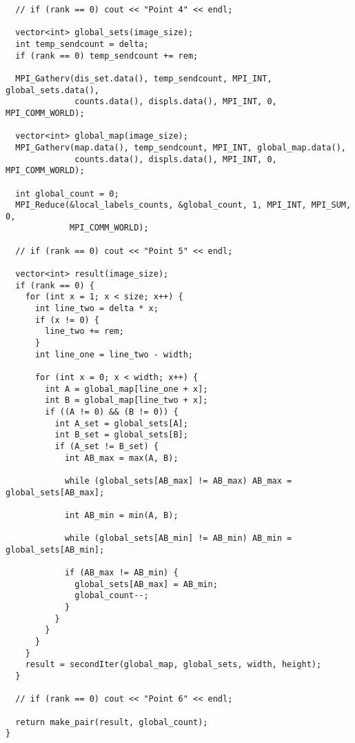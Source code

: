 \documentclass{report}
\begin{document}
\begin{lstlisting}
  // if (rank == 0) cout << "Point 4" << endl;

  vector<int> global_sets(image_size);
  int temp_sendcount = delta;
  if (rank == 0) temp_sendcount += rem;

  MPI_Gatherv(dis_set.data(), temp_sendcount, MPI_INT, global_sets.data(),
              counts.data(), displs.data(), MPI_INT, 0, MPI_COMM_WORLD);

  vector<int> global_map(image_size);
  MPI_Gatherv(map.data(), temp_sendcount, MPI_INT, global_map.data(),
              counts.data(), displs.data(), MPI_INT, 0, MPI_COMM_WORLD);

  int global_count = 0;
  MPI_Reduce(&local_labels_counts, &global_count, 1, MPI_INT, MPI_SUM, 0,
             MPI_COMM_WORLD);

  // if (rank == 0) cout << "Point 5" << endl;

  vector<int> result(image_size);
  if (rank == 0) {
    for (int x = 1; x < size; x++) {
      int line_two = delta * x;
      if (x != 0) {
        line_two += rem;
      }
      int line_one = line_two - width;

      for (int x = 0; x < width; x++) {
        int A = global_map[line_one + x];
        int B = global_map[line_two + x];
        if ((A != 0) && (B != 0)) {
          int A_set = global_sets[A];
          int B_set = global_sets[B];
          if (A_set != B_set) {
            int AB_max = max(A, B);

            while (global_sets[AB_max] != AB_max) AB_max = global_sets[AB_max];

            int AB_min = min(A, B);

            while (global_sets[AB_min] != AB_min) AB_min = global_sets[AB_min];

            if (AB_max != AB_min) {
              global_sets[AB_max] = AB_min;
              global_count--;
            }
          }
        }
      }
    }
    result = secondIter(global_map, global_sets, width, height);
  }

  // if (rank == 0) cout << "Point 6" << endl;

  return make_pair(result, global_count);
}
	\end{lstlisting}
\end{document}
